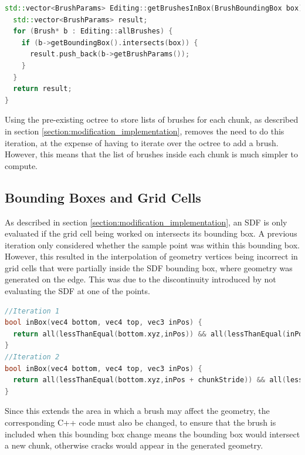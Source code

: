 \documentclass{article}
\begin{document}
\begin{lstlisting}[language=C++,label={edit_storage_1},caption={Iteration over every brush, returning those that intersect the bounding box of the chunk.}]
std::vector<BrushParams> Editing::getBrushesInBox(BrushBoundingBox box) {
  std::vector<BrushParams> result;
  for (Brush* b : Editing::allBrushes) {
    if (b->getBoundingBox().intersects(box)) {
      result.push_back(b->getBrushParams());
    }
  }
  return result;
}
\end{lstlisting}

Using the pre-existing octree to store lists of brushes for each chunk, as described in section \ref{section:modification_implementation}, removes the need to do this iteration, at the expense of having to iterate over the octree to add a brush. However, this means that the list of brushes inside each chunk is much simpler to compute.

\subsection{Bounding Boxes and Grid Cells}
As described in section \ref{section:modification_implementation}, an SDF is only evaluated if the grid cell being worked on intersects its bounding box. A previous iteration only considered whether the sample point was within this bounding box. However, this resulted in the interpolation of geometry vertices being incorrect in grid cells that were partially inside the SDF bounding box, where geometry was generated on the edge. This was due to the discontinuity introduced by not evaluating the SDF at one of the points. 

\begin{lstlisting}[language=C++,label={bb_gc},caption={The first iteration of the test of a grid cell point against an SDF bounding box defined by \texttt{bottom} and \texttt{top}, followed by the second iteration, which includes the value \texttt{chunkStride} to ensure that the SDF is considered if the sample point is within 1 grid cell of the bounding box.}]
//Iteration 1
bool inBox(vec4 bottom, vec4 top, vec3 inPos) {
  return all(lessThanEqual(bottom.xyz,inPos)) && all(lessThanEqual(inPos,top.xyz));
}
//Iteration 2
bool inBox(vec4 bottom, vec4 top, vec3 inPos) {
  return all(lessThanEqual(bottom.xyz,inPos + chunkStride)) && all(lessThanEqual(inPos - chunkStride,top.xyz));
}
\end{lstlisting}

Since this extends the area in which a brush may affect the geometry, the corresponding C++ code must also be changed, to ensure that the brush is included when this bounding box change means the bounding box would intersect a new chunk, otherwise cracks would appear in the generated geometry.
\end{document}
